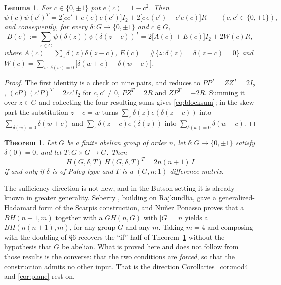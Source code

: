 \documentclass[11pt]{article}
\newtheorem{theorem}{Theorem}
\newtheorem{lemma}{Lemma}
\newcommand{\I}{I}
\begin{document}
\begin{lemma}\label{lem:pair}
For \(c\in\{0,\pm1\}\) put \(e(c)=1-c^{2}\).  Then
\[
        \psi(c)\psi(c')^{T}
        =2\bigl[cc'+e(c)e(c')\bigr]\I_2
         +2\bigl[c\,e(c')-c'e(c)\bigr]R
        \qquad(c,c'\in\{0,\pm1\}),
\]
and consequently, for every \(\delta\colon G\to\{0,\pm1\}\) and \(c\in G\),
\[
        B(c):=\sum_{z\in G}\psi(\delta(z))\psi(\delta(z-c))^{T}
        =2\bigl[A(c)+E(c)\bigr]\I_2+2W(c)R,
        \tag{5.1}\label{eq:blocksum}
\]
where \(A(c)=\sum_{z}\delta(z)\delta(z-c)\),
\(E(c)=\#\{z:\delta(z)=\delta(z-c)=0\}\) and
\(W(c)=\sum_{w:\,\delta(w)=0}\bigl[\delta(w+c)-\delta(w-c)\bigr]\).
\end{lemma}

\begin{proof}
The first identity is a check on nine pairs, and reduces to
\(PP^{T}=ZZ^{T}=2\I_2\), \((cP)(c'P)^{T}=2cc'\I_2\) for \(c,c'\neq0\),
\(PZ^{T}=2R\) and \(ZP^{T}=-2R\).  Summing it over \(z\in G\) and collecting
the four resulting sums gives \eqref{eq:blocksum}; in the skew part the
substitution \(z-c=w\) turns \(\sum_z\delta(z)e(\delta(z-c))\) into
\(\sum_{\delta(w)=0}\delta(w+c)\) and \(\sum_z\delta(z-c)e(\delta(z))\) into
\(\sum_{\delta(w)=0}\delta(w-c)\).
\end{proof}

\begin{theorem}\label{thm:char}
Let \(G\) be a finite abelian group of order \(n\), let
\(\delta\colon G\to\{0,\pm1\}\) satisfy \(\delta(0)=0\), and let
\(T\colon G\times G\to G\).  Then
\[
        H(G,\delta,T)\,H(G,\delta,T)^{T}=2n(n+1)\,\I
\]
if and only if \(\delta\) is of Paley type and \(T\) is a
\((G,n;1)\)-difference matrix.
\end{theorem}

The sufficiency direction is not new, and in the Butson setting it is
already known in greater generality.  Seberry \cite{Seberry1980}, building
on Rajkundlia, gave a generalized-Hadamard form of the Scarpis
construction, and Nu\~nez Ponasso \cite[Thm.~4.3.3]{Ponasso2024} proves
that a \(BH(n+1,m)\) together with a \(GH(n,G)\) with \(|G|=n\) yields a
\(BH(n(n+1),m)\), for any group \(G\) and any \(m\).  Taking \(m=4\) and
composing with the doubling of \S6 recovers the ``if'' half of
Theorem~\ref{thm:char} without the hypothesis that \(G\) be abelian.  What
is proved here and does not follow from those results is the converse:
that the two conditions are \emph{forced}, so that the construction admits
no other input.  That is the direction Corollaries~\ref{cor:mod4} and
\ref{cor:plane} rest on.
\end{document}
